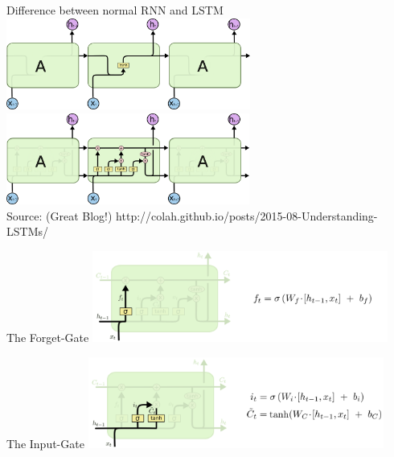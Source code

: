 \begin{frame}{Difference between normal RNN and LSTM}
\includegraphics[height=3.0cm]{data/LSTM3-SimpleRNN.png}\\ 
\includegraphics[height=3.0cm]{data/LSTM3-chain.png}\\
Source: (Great Blog!) http://colah.github.io/posts/2015-08-Understanding-LSTMs/ 
\end{frame}


\begin{frame}{The Forget-Gate}
\includegraphics[height=3.0cm]{data/LSTM3-focus-f.png}\\ 
\end{frame}

\begin{frame}{The Input-Gate}
\includegraphics[height=3.0cm]{data/LSTM3-focus-i.png}\\ 
\end{frame}

